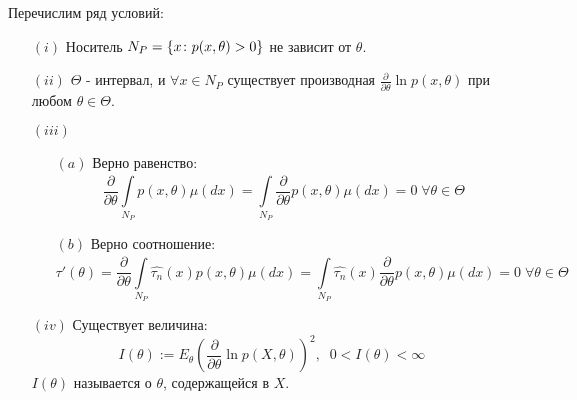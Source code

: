 \begin{condition}[\red{R}]\label{lec:4/sec:1}
	Перечислим ряд условий:
	\begin{itemize}
		\item[$(i)$] Носитель $N_P = \left\{x\colon p(x, \theta) > 0\right\}$ не зависит от $\theta$.
		\item[$(ii)$] $\Theta$ - интервал, и $\forall x \in N_P$ существует производная $\frac{\partial}{\partial \theta} \ln p(x, \theta)$ при любом $\theta \in \Theta$.
		\item[$(iii)$] 
			\begin{itemize}
				\item[$(a)$] Верно равенство:
				$$\frac{\partial}{\partial \theta} \underset{N_P}{\overset{}{\int}}p(x, \theta) \mu (dx) = \underset{N_P}{\overset{}{\int}}\frac{\partial}{\partial \theta} p(x, \theta) \mu(dx) = 0 \; \forall \theta \in \Theta$$
				\item[$(b)$] Верно соотношение:
				$$\tau' (\theta) = \frac{\partial}{\partial \theta} \underset{N_P}{\overset{}{\int}} \hat{\tau_n}(x) p(x, \theta) \mu (dx) = \underset{N_P}{\overset{}{\int}} \hat{\tau_n}(x)\frac{\partial}{\partial \theta} p(x, \theta) \mu(dx) = 0 \; \forall \theta \in \Theta$$
			\end{itemize}
		\item[$(iv)$] Существует величина:
		$$I(\theta) := E_{\theta} \left( \frac{\partial}{\partial \theta} \ln p(X, \theta)\right)^2, \;\; 0 < I(\theta) < \infty$$
		$I(\theta)$ называется  о $\theta$, содержащейся в $X$.
	\end{itemize}
\end{condition}

